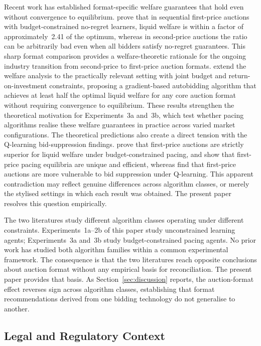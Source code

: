 Recent work has established format-specific welfare guarantees that hold even without convergence to equilibrium. \citet{FikiorisTardos2023} prove that in sequential first-price auctions with budget-constrained no-regret learners, liquid welfare is within a factor of approximately~2.41 of the optimum, whereas in second-price auctions the ratio can be arbitrarily bad even when all bidders satisfy no-regret guarantees. This sharp format comparison provides a welfare-theoretic rationale for the ongoing industry transition from second-price to first-price auction formats. \citet{Lucier2023PacingDynamics} extend the welfare analysis to the practically relevant setting with joint budget and return-on-investment constraints, proposing a gradient-based autobidding algorithm that achieves at least half the optimal liquid welfare for any core auction format without requiring convergence to equilibrium. These results strengthen the theoretical motivation for Experiments~3a and~3b, which test whether pacing algorithms realise these welfare guarantees in practice across varied market configurations. The theoretical predictions also create a direct tension with the Q-learning bid-suppression findings. \citet{FikiorisTardos2023} prove that first-price auctions are strictly superior for liquid welfare under budget-constrained pacing, and \citet{Conitzer2022FPPE} show that first-price pacing equilibria are unique and efficient, whereas \citet{BanchioSkrzypacz2022} find that first-price auctions are more vulnerable to bid suppression under Q-learning. This apparent contradiction may reflect genuine differences across algorithm classes, or merely the stylised settings in which each result was obtained. The present paper resolves this question empirically.

The two literatures study different algorithm classes operating under different constraints. Experiments~1a--2b of this paper study unconstrained learning agents; Experiments~3a and~3b study budget-constrained pacing agents. No prior work has studied both algorithm families within a common experimental framework. The consequence is that the two literatures reach opposite conclusions about auction format without any empirical basis for reconciliation. The present paper provides that basis. As Section~\ref{sec:discussion} reports, the auction-format effect reverses sign across algorithm classes, establishing that format recommendations derived from one bidding technology do not generalise to another.

\subsection{Legal and Regulatory Context}

